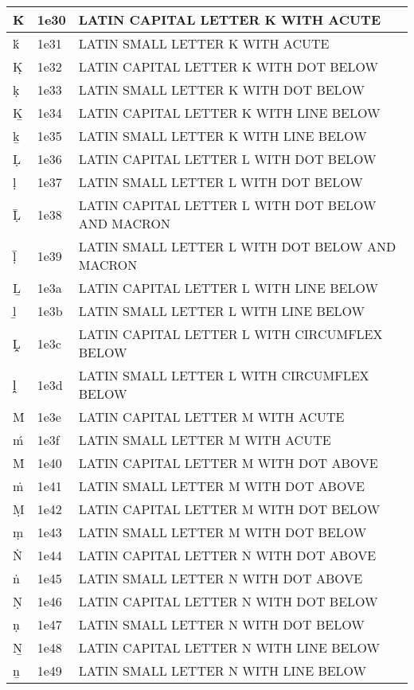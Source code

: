 \documentclass[12pt,letterpaper,openany]{book}
\begin{document}
\begin{center}
\begin{supertabular}{|m{0.25in}|m{0.5in}|m{4in}|}
			Ḱ & 1e30 & LATIN CAPITAL LETTER K WITH ACUTE\\\hline
			ḱ & 1e31 & LATIN SMALL LETTER K WITH ACUTE\\\hline
			Ḳ & 1e32 & LATIN CAPITAL LETTER K WITH DOT BELOW\\\hline
			ḳ & 1e33 & LATIN SMALL LETTER K WITH DOT BELOW\\\hline
			Ḵ & 1e34 & LATIN CAPITAL LETTER K WITH LINE BELOW\\\hline
			ḵ & 1e35 & LATIN SMALL LETTER K WITH LINE BELOW\\\hline
			Ḷ & 1e36 & LATIN CAPITAL LETTER L WITH DOT BELOW\\\hline
			ḷ & 1e37 & LATIN SMALL LETTER L WITH DOT BELOW\\\hline
			Ḹ & 1e38 & LATIN CAPITAL LETTER L WITH DOT BELOW AND MACRON\\\hline
			ḹ & 1e39 & LATIN SMALL LETTER L WITH DOT BELOW AND MACRON\\\hline
			Ḻ & 1e3a & LATIN CAPITAL LETTER L WITH LINE BELOW\\\hline
			ḻ & 1e3b & LATIN SMALL LETTER L WITH LINE BELOW\\\hline
			Ḽ & 1e3c & LATIN CAPITAL LETTER L WITH CIRCUMFLEX BELOW\\\hline
			ḽ & 1e3d & LATIN SMALL LETTER L WITH CIRCUMFLEX BELOW\\\hline
			Ḿ & 1e3e & LATIN CAPITAL LETTER M WITH ACUTE\\\hline
			ḿ & 1e3f & LATIN SMALL LETTER M WITH ACUTE\\\hline
			Ṁ & 1e40 & LATIN CAPITAL LETTER M WITH DOT ABOVE\\\hline
			ṁ & 1e41 & LATIN SMALL LETTER M WITH DOT ABOVE\\\hline
			Ṃ & 1e42 & LATIN CAPITAL LETTER M WITH DOT BELOW\\\hline
			ṃ & 1e43 & LATIN SMALL LETTER M WITH DOT BELOW\\\hline
			Ṅ & 1e44 & LATIN CAPITAL LETTER N WITH DOT ABOVE\\\hline
			ṅ & 1e45 & LATIN SMALL LETTER N WITH DOT ABOVE\\\hline
			Ṇ & 1e46 & LATIN CAPITAL LETTER N WITH DOT BELOW\\\hline
			ṇ & 1e47 & LATIN SMALL LETTER N WITH DOT BELOW\\\hline
			Ṉ & 1e48 & LATIN CAPITAL LETTER N WITH LINE BELOW\\\hline
			ṉ & 1e49 & LATIN SMALL LETTER N WITH LINE BELOW\\\hline

\end{supertabular}
\end{center}
\end{document}
